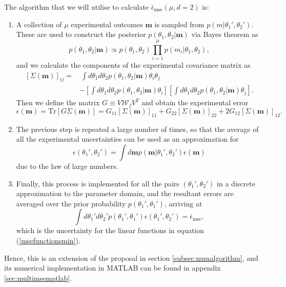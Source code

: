 The algorithm that we will utilise to calculate $\bar{\epsilon}_\mathrm{mse}(\mu, d = 2)$ is:
\begin{enumerate}
\item A collection of $\mu$ experimental outcomes $\boldsymbol{m}$ is sampled from $p(m|\theta_1', \theta_2')$. These are used to construct the posterior $p(\theta_1, \theta_2|\boldsymbol{m})$ via Bayes theorem as
\begin{equation}
p(\theta_1, \theta_2|\boldsymbol{m}) \propto p(\theta_1, \theta_2) \prod_{i=1}^\mu p(m_i|\theta_1, \theta_2), 
\end{equation}
and we calculate the components of the experimental covariance matrix as
\begin{align}
\left[\Sigma(\boldsymbol{m})\right]_{ij} = &~ \int d\theta_1 d\theta_2 p(\theta_1, \theta_2|\boldsymbol{m})\theta_i \theta_j 
\nonumber \\
&- \left[\int d\theta_1 d\theta_2 p(\theta_1, \theta_2|\boldsymbol{m})\theta_i\right] \left[\int d\theta_1 d\theta_2 p(\theta_1, \theta_2|\boldsymbol{m})\theta_j\right].
\end{align}
Then we define the matrix $G \equiv V \mathcal{W}_f V^T$ and obtain the experimental error
\begin{equation}
\epsilon(\boldsymbol{m})=\mathrm{Tr}\left[G \Sigma(\boldsymbol{m})\right] = G_{11} [\Sigma(\boldsymbol{m})]_{11} + G_{22} [\Sigma(\boldsymbol{m})]_{22} + 2 G_{12} [\Sigma(\boldsymbol{m})]_{12}.
\label{linearexperrmatlab}
\end{equation}

\item The previous step is repeated a large number of times, so that the average of all the experimental uncertainties can be used as an approximation for
\begin{equation}
\epsilon(\theta_1', \theta_2') = \int d\boldsymbol{m}p(\boldsymbol{m}|\theta_1', \theta_2')\epsilon(\boldsymbol{m})
\end{equation}
due to the law of large numbers. 

\item Finally, this process is implemented for all the pairs $(\theta_1', \theta_2')$ in a discrete approximation to the parameter domain, and the resultant errors are averaged over the prior probability $p(\theta_1', \theta_1')$, arriving at
\begin{equation}
\int d\theta_1' d\theta_2' p(\theta_1', \theta_1') \epsilon(\theta_1', \theta_2') = \bar{\epsilon}_{\mathrm{mse}},
\end{equation}
which is the uncertainty for the linear functions in equation (\ref{msefunctionsmin}).
\end{enumerate}
Hence, this is an extension of the proposal in section \ref{subsec:numalgorithm}, and its numerical implementation in MATLAB can be found in appendix \ref{sec:multimsematlab}.

